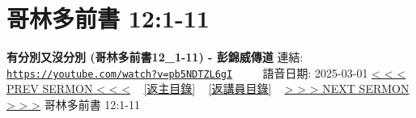\documentclass{book}
\begin{document}
\section{哥林多前書 12:1-11}
\label{sec:pb5NDTZL6gI}
\textbf{有分別又沒分別 (哥林多前書12\_1-11) - 彭錦威傳道}
\newline
\newline
連結: \href{https://youtube.com/watch?v=pb5NDTZL6gI}{\texttt{https://youtube.com/watch?v=pb5NDTZL6gI}} ~~~~ 語音日期: 2025-03-01
\newline
\newline
\hyperref[sec:Ii_o05jkhEI]{< < < PREV SERMON < < <}
~
\hyperlink{toc}{[返主目錄]}
~
\hyperref[ch:preacher3]{[返講員目錄]}
~
\hyperref[sec:Y_0n0vkhyDU]{> > > NEXT SERMON > > >}
\newline
\newline
哥林多前書 12:1-11
\newline
\end{document}
